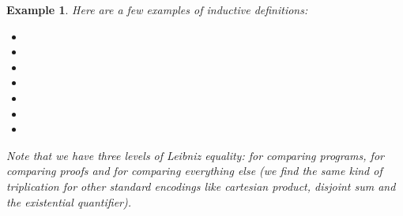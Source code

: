 \documentclass[a4paper,USenglish]{lipics}
\newtheorem{exm}{Example}
\def\cic{\textsf{CIC}\xspace}
\begin{document}
\begin{exm} Here are a few examples of inductive definitions:
 \begin{itemize}
  \item 
  \item 
\begin{comment}
  \item 
\end{comment}
  \item 
  \item 
\begin{comment}
  \item 
  \item 
  \item 
\end{comment}
 \item 
 \item 
 \item 
 \end{itemize}

Note that we have three levels of Leibniz equality:  for comparing
programs,  for comparing proofs and  for comparing everything
else (we find the same kind of triplication for other standard encodings like
cartesian product, disjoint sum and the existential quantifier).
\end{exm}

\begin{comment}
Strong elimination from  to  is widely used in \cic. For
instance, as
it allows to destruct the equality  to build informative types,
it is possible to build elements of  in the absurd context where
. Strong elimination is also used in \cic to define fixpoints
by destructing the accessibility condition of a well-founded relation.
\end{comment}
\begin{comment}
For coherence reasons, eliminations from  to higher sorts are
restricted. This is the restriction (1), which states that the inductive definition
should have
at most one constructor and that all the arguments (which are not parameters)
of this constructor should be of sort :

This restriction is essential: if these eliminations were unrestrained,
not only the extraction would be unable to erase proofs but also the system
would be inconsistent~\cite{DBLP:conf/lics/Coquand86}.

From the computational point of view, it is natural that computing an
informative type should not rely on any proof structure, that would
disappear during program extraction. Allowing large elimination under
restriction~(\ref{eq:restr1}) has a computational meaning: informally,
since there is at most one branch, we know the structure of the proof,
and since this branch depends only on proofs, they are erased, so it is
not a problem if the whole branch is erased (one can refer
to~\cite{DBLP:conf/types/Letouzey02,letouzey04} for formal details).

To sum up: when building a program, inspecting a proof or a program has a
correct computational behavior. Moreover we cannot inspect an arity, since
inductive definitions cannot be of sort .
\end{comment}
\end{document}
